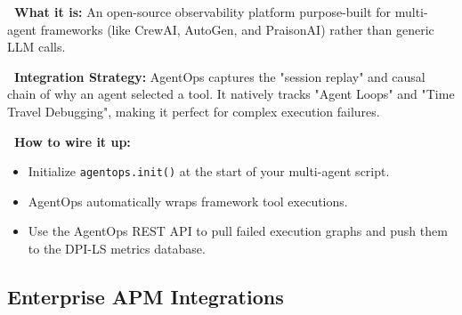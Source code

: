 \documentclass[11pt,a4paper]{article}
\begin{document}
\begin{tcolorbox}[enhanced, colback=gray!5!white, colframe=gray, title={\textbf{\faUsersCog\ AgentOps}}, fonttitle=\bfseries, boxrule=1pt, arc=2mm]
\textbf{\color{dpiblue}\faQuestionCircle\ What it is:} An open-source observability platform purpose-built for multi-agent frameworks (like CrewAI, AutoGen, and PraisonAI) rather than generic LLM calls.

\vspace{0.2cm}
\textbf{\color{dpigreen}\faCogs\ Integration Strategy:} AgentOps captures the "session replay" and causal chain of why an agent selected a tool. It natively tracks "Agent Loops" and "Time Travel Debugging", making it perfect for complex execution failures.

\vspace{0.2cm}
\textbf{\color{dpicloud}\faPlug\ How to wire it up:}
\begin{itemize}
    \item \textbf{\color{gray}\faTerminal} Initialize \texttt{agentops.init()} at the start of your multi-agent script.
    \item \textbf{\color{gray}\faBox} AgentOps automatically wraps framework tool executions.
    \item \textbf{\color{gray}\faDownload} Use the AgentOps REST API to pull failed execution graphs and push them to the DPI-LS metrics database.
\end{itemize}
\end{tcolorbox}

\vspace{0.3cm}

\subsection{Enterprise APM Integrations}
\end{document}

